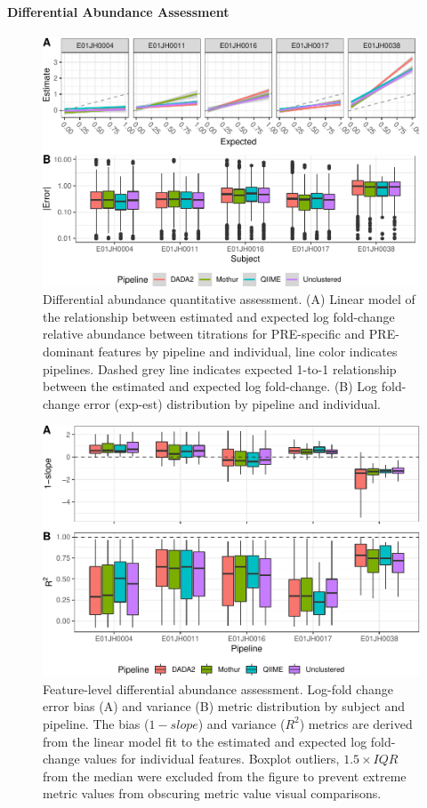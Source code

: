 \documentclass[linenumbers]{bmcart}
\begin{document}
\paragraph{Differential Abundance Assessment}
\begin{figure}
\centering
\includegraphics{logFCerror-1.pdf}
\caption{\label{fig:logFCerror} Differential abundance quantitative assessment. (A) Linear model of the relationship between
estimated and expected log fold-change relative abundance between titrations for PRE-specific and
PRE-dominant features by pipeline and individual, line color indicates
pipelines. Dashed grey line indicates expected 1-to-1 relationship
between the estimated and expected log fold-change. (B) Log fold-change
error (\textbar{}exp-est\textbar{}) distribution by pipeline and
individual.}
\end{figure}

\begin{figure}
\centering
\includegraphics{logFcErrorMetrics-1.pdf}
\caption{\label{fig:logFcErrorMetrics}Feature-level differential abundance assessment. Log-fold change error
bias (A) and variance (B) metric distribution by subject and pipeline.
The bias (\(1 - slope\)) and variance (\(R^2\)) metrics are derived from
the linear model fit to the estimated and expected log fold-change
values for individual features. Boxplot outliers, \(1.5\times IQR\) from
the median were excluded from the figure to prevent extreme metric
values from obscuring metric value visual comparisons.}
\end{figure}
\end{document}
